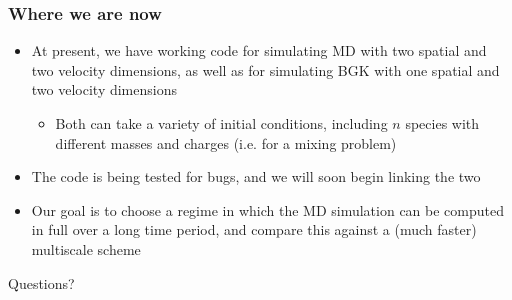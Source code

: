 \documentclass{beamer}
\begin{document}
\begin{frame}
\frametitle{Where we are now}
\begin{itemize}
\item At present, we have working code for simulating MD with two spatial and two velocity dimensions, as well as for simulating BGK with one spatial and two velocity dimensions
\vspace{1em}
\begin{itemize}\item Both can take a variety of initial conditions, including $n$ species with different masses and charges (i.e. for a mixing problem)\vspace{1em}
\end{itemize}

\item The code is being tested for bugs, and we will soon begin linking the two
\vspace{1em}
\item Our goal is to choose a regime in which the MD simulation can be computed in full over a long time period, and compare this against a (much faster) multiscale scheme
\end{itemize}
\end{frame}

\begin{frame}
\begin{center}\huge Questions?\end{center}
\end{frame}
\end{document}
